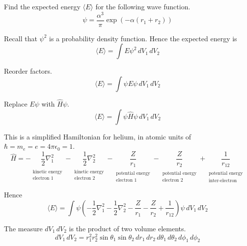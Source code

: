 \documentclass[12pt]{article}
\begin{document}
\noindent
Find the expected energy $\langle E\rangle$ for the following wave function.
\begin{equation*}
\psi=\frac{\alpha^3}{\pi}\exp\left(-\alpha (r_1+r_2)\right)
\end{equation*}

\noindent
Recall that $\psi^2$ is a probability density function.
Hence the expected energy is
\begin{equation*}
\langle E\rangle=\int E\psi^2\,dV_1\,dV_2
\end{equation*}

\noindent
Reorder factors.
\begin{equation*}
\langle E\rangle=\int\psi E\psi\,dV_1\,dV_2
\end{equation*}

\noindent
Replace $E\psi$ with $\hat{H}\psi$.
\begin{equation*}
\langle E\rangle=\int\psi\hat{H}\psi\,dV_1\,dV_2
\end{equation*}

\noindent
This is a simplified Hamiltonian for helium, in atomic units of $\hbar=m_e=e=4\pi\epsilon_0=1$.
\begin{equation*}
\hat{H}=
-\underset{\substack{\\[1ex]\text{kinetic energy}\\\text{electron 1}}}{\frac{1}{2}\nabla^2_1}
-\underset{\substack{\\[1ex]\text{kinetic energy}\\\text{electron 2}}}{\frac{1}{2}\nabla^2_2}
-\underset{\substack{\\[1ex]\text{potential energy}\\\text{electron 1}}}{\frac{Z}{r_1}}
-\underset{\substack{\\[1ex]\text{potential energy}\\\text{electron 2}}}{\frac{Z}{r_2}}
+\underset{\substack{\\[1ex]\text{potential energy}\\\text{inter-electron}}}{\frac{1}{r_{12}}}
\end{equation*}

\noindent
Hence
\begin{equation*}
\langle E\rangle=
\int\psi\left(
-\frac{1}{2}\nabla^2_1
-\frac{1}{2}\nabla^2_2
-\frac{Z}{r_1}
-\frac{Z}{r_2}
+\frac{1}{r_{12}}
\right)\psi\,dV_1\,dV_2
\end{equation*}

\noindent
The measure $dV_1\,dV_2$ is the product of two volume elements.
\begin{equation*}
dV_1\,dV_2=r_1^2 r_2^2 \sin\theta_1 \sin\theta_2
\,dr_1\,dr_2\,d\theta_1\,d\theta_2\,d\phi_1\,d\phi_2
\end{equation*}
\end{document}
